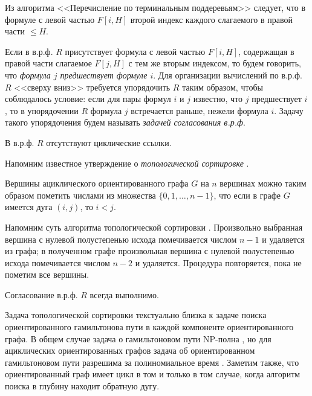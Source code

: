 Из алгоритма <<Перечисление по терминальным поддеревьям>> следует, что в формуле с левой частью $F[i,H]$ второй индекс каждого слагаемого в правой части  $\leq H$.

Если в в.р.ф. $R$ присутствует формула с левой частью $F[i,H]$, содержащая в правой части слагаемое $F[j,H]$ с тем же вторым индексом, то будем говорить, что \textit{ формула $j$ предшествует формуле $i$}. Для организации вычислений по в.р.ф. $R$ <<сверху вниз>> требуется упорядочить $R$ таким образом, чтобы соблюдалось условие: если для пары формул $i$ и $j$ известно, что $j$ предшествует $i$, то в упорядочении $R$ формула $j$ встречается раньше, нежели формула $i$. Задачу такого упорядочения будем называть \textit{ задачей согласования в.р.ф}.

\begin{statement} \label{akm1the6}
В в.р.ф. $R$ отсутствуют циклические ссылки.
\end{statement} 

Напомним известное утверждение о \textit{ топологической сортировке}
\cite{akm_13}.

\begin{statement} \label{akm1the7}
Вершины ациклического ориентированного графа $G$ на $n$ вершинах можно таким образом пометить числами из множества $\{0, 1, \dots, n-1\}$, что если в графе $G$ имеется дуга $(i,j)$, то $i<j$.
\end{statement} 


Напомним суть алгоритма топологической сортировки \cite{akm_13}. Произвольно выбранная вершина с нулевой полустепенью исхода помечивается числом $n-1$ и удаляется из графа; в полученном графе произвольная вершина с нулевой полустепенью исхода помечивается числом $n-2$ и удаляется. Процедура повторяется, пока не пометим все вершины.

\begin{statement} \label{akm1the8}
Согласование в.р.ф. $R$ всегда выполнимо.
\end{statement} 

\begin{remark} Задача топологической сортировки текстуально близка к задаче поиска ориентированного гамильтонова пути в каждой компоненте ориентированного графа. В общем случае задача о гамильтоновом пути NP-полна \cite{akm_14}, но для ациклических ориентированных графов задача об ориентированном гамильтоновом пути разрешима за полиномиальное время
\cite{akm_15}. Заметим также, что ориентированный граф имеет цикл в том и только в том случае, когда алгоритм поиска в глубину \cite{akm_16} находит обратную дугу.
\end{remark}


